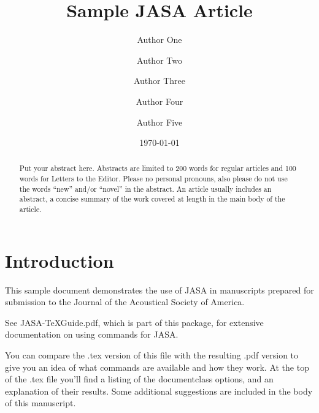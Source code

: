 \title[JASA/Sample JASA Article]{Sample JASA Article}
\author{Author One}
\author{Author Two}
\author{Author Three}


\author{Author Four}

\author{Author Five}



\date{\today}

\begin{abstract}
Put your abstract here. Abstracts are limited to 200 words for
regular articles and 100 words for Letters to the Editor. Please no
personal pronouns, also please do not use the words ``new'' and/or
``novel'' in the abstract. An article usually includes an abstract, a
concise summary of the work covered at length in the main body of the
article.
\end{abstract}


\maketitle




\section{\label{sec:1} Introduction}
This sample document demonstrates the use of JASA in manuscripts
prepared for submission to the Journal of the Acoustical Society of America.

See JASA-TeXGuide.pdf, which is part of this package, for extensive
documentation on using commands for JASA.

You can compare the .tex version of this file with the resulting .pdf
version to give you an idea of what  commands are available and how
they work. At the top of the .tex file you'll find a listing of the
documentclass options, and an explanation of their results.
Some additional suggestions are included in the body of this
manuscript.

